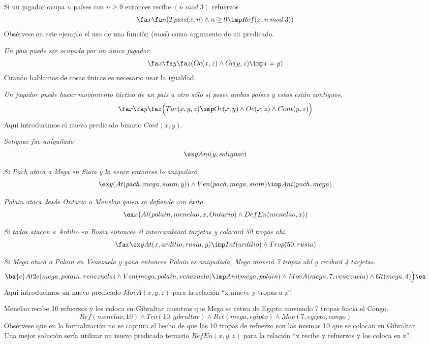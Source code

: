 \documentclass[11pt,letterpaper]{article}
\begin{document}
 \item Si un jugador ocupa $n$  pa\'ises con $n \geq 9$ entonces recibe
  $(n\;mod\;3)$ refuerzos
    \[
    \fa x\fa n(Tpais(x,n)\land n\geq 9\imp Ref(x,n\;mod\;3))
    \]
 Obsérvese en este ejemplo el uso de una función ($mod$) como
 argumento de un predicado. 

 \item \textit{Un pais puede ser ocupado por un único jugador.}
  \[
  \fa x\fa y\fa z (Oc(x,z)\land Oc(y,z)\imp x=y)
  \]
  Cuando hablamos de cosas únicas es necesario usar la igualdad.
  
 \item \textit{Un jugador puede hacer movimiento táctico de un pais a otro
   sólo si posee ambos pa\'ises y estos están contiguos.}
   \[
   \fa x\fa y\fa z\Big( Tac(x,y,z)\imp Oc(x,y)\land Oc(x,z)\land Cont(y,z)\Big)
   \]
Aquí introducimos el nuevo predicado binario $Cont(x,y)$. 
  
 \item \textit{Solignac fue aniquilado}  \[ \ex y Ani(y,solignac)\]

 \item \textit{Si Pach ataca a Mega en Siam y lo vence entonces lo aniquilará}
  \[
  \ex y (At(pach,mega,siam,y))\land Ven(pach,mega,siam)\imp Ani(pach,mega)
  \]

 \item \textit{Polain ataca desde Ontario a Menelao quien se defiende con
   éxito.}
  \[
   \ex x\big(  At(polain,menelao,x,Ontario)\land DefEn(menelao,x))
  \]

 \item \textit{Si todos atacan a Ardilio en Rusia entonces  él intercambiará
  tarjetas y colocará 50 tropas ahí.}
  \[
   \fa x \ex y At(x,ardilio,rusia,y)\imp Int(ardilio)\land Trop(50,rusia)
  \]

 \item \textit{Si Mega ataca a Polain en Venezuela y gana entonces Polain
   es aniquilada, Mega moverá 7 tropas ahí y recibirá 4 tarjetas.}
        \[
        \ba{c}
        At2e(mega,polain,venezuela) \land Ven(mega,polain,venezuela)\imp
        \\
        Ani(mega,polain)\land MovA(mega,7,venezuela)\land Gt(mega,4)\Big)
        \ea
        \]
 Aquí introducimos un nuevo predicado $MovA(x,y,z)$ para la relación 
 \enquote{x mueve y tropas a z}.
 
 \item Menelao recibe 10 refuerzos y los coloca en Gibraltar mientras que
  Mega se retira de Egipto moviendo 7 tropas hacia el Congo.
  \[
  Ref(menelao,10)\land Tro(10,gibraltar)\land Ret(mega,egipto)\land 
  Mov(7,egipto,congo)
  \]
Obsérvese que en la formalización no se captura el hecho de que las 10
tropas de refuerzo son las mismas 10 que se colocan en Gibraltar. Una
mejor solución sería utilizar un nuevo predicado ternario
$RefEn(x,y,z)$ para la relación 
\enquote{x recibe y refuerzos y los coloca en z}.
  
\end{document}
